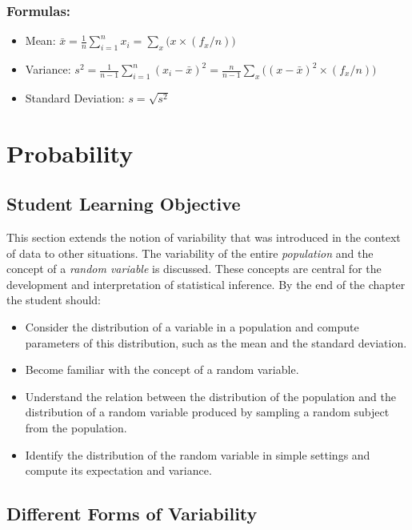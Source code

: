 \documentclass[]{krantz}
\theoremstyle{definition}
\theoremstyle{definition}
\theoremstyle{definition}
\theoremstyle{remark}
\begin{document}
\subsection*{Formulas:}\label{formulas}


\begin{itemize}
\item
  Mean:
  \(\bar x = \frac{1}{n} \sum_{i=1}^n x_i = \sum_x \big(x \times (f_x/n)\big)\)
\item
  Variance:
  \(s^2 = \frac{1}{n-1}\sum_{i=1}^n (x_i - \bar x)^2 = \frac{n}{n-1}\sum_x \big((x - \bar x)^2\times (f_x/n)\big)\)
\item
  Standard Deviation: \(s = \sqrt{s^2}\)
\end{itemize}

\chapter{Probability}\label{ChapProbability}

\section{Student Learning Objective}\label{student-learning-objective}

This section extends the notion of variability that was introduced in
the context of data to other situations. The variability of the entire
\emph{population} and the concept of a \emph{random variable} is
discussed. These concepts are central for the development and
interpretation of statistical inference. By the end of the chapter the
student should:

\begin{itemize}
\item
  Consider the distribution of a variable in a population and compute
  parameters of this distribution, such as the mean and the standard
  deviation.
\item
  Become familiar with the concept of a random variable.
\item
  Understand the relation between the distribution of the population and
  the distribution of a random variable produced by sampling a random
  subject from the population.
\item
  Identify the distribution of the random variable in simple settings
  and compute its expectation and variance.
\end{itemize}

\section{Different Forms of
Variability}\label{different-forms-of-variability}
\end{document}
